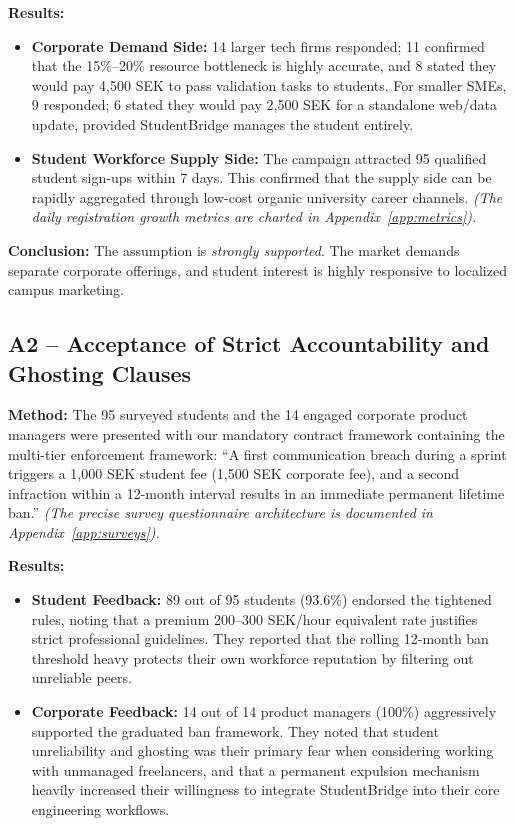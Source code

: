 \documentclass[12pt,a4paper]{article}
\begin{document}
\textbf{Results:}
\begin{itemize}
    \item \textbf{Corporate Demand Side:} 14 larger tech firms responded; 11 confirmed that the 15\%--20\% resource bottleneck is highly accurate, and 8 stated they would pay 4,500 SEK to pass validation tasks to students. For smaller SMEs, 9 responded; 6 stated they would pay 2,500 SEK for a standalone web/data update, provided StudentBridge manages the student entirely.
    \item \textbf{Student Workforce Supply Side:} The campaign attracted 95 qualified student sign-ups within 7 days. This confirmed that the supply side can be rapidly aggregated through low-cost organic university career channels. \textit{(The daily registration growth metrics are charted in Appendix~\ref{app:metrics}).}
\end{itemize}

\textbf{Conclusion:} The assumption is \emph{strongly supported}. The market demands separate corporate offerings, and student interest is highly responsive to localized campus marketing.

\subsection{A2 -- Acceptance of Strict Accountability and Ghosting Clauses}

\textbf{Method:} The 95 surveyed students and the 14 engaged corporate product managers were presented with our mandatory contract framework containing the multi-tier enforcement framework: ``A first communication breach during a sprint triggers a 1,000 SEK student fee (1,500 SEK corporate fee), and a second infraction within a 12-month interval results in an immediate permanent lifetime ban.'' \textit{(The precise survey questionnaire architecture is documented in Appendix~\ref{app:surveys}).}

\textbf{Results:}
\begin{itemize}
    \item \textbf{Student Feedback:} 89 out of 95 students (93.6\%) endorsed the tightened rules, noting that a premium 200--300 SEK/hour equivalent rate justifies strict professional guidelines. They reported that the rolling 12-month ban threshold heavy protects their own workforce reputation by filtering out unreliable peers.
    \item \textbf{Corporate Feedback:} 14 out of 14 product managers (100\%) aggressively supported the graduated ban framework. They noted that student unreliability and ghosting was their primary fear when considering working with unmanaged freelancers, and that a permanent expulsion mechanism heavily increased their willingness to integrate StudentBridge into their core engineering workflows.
\end{itemize}
\end{document}
